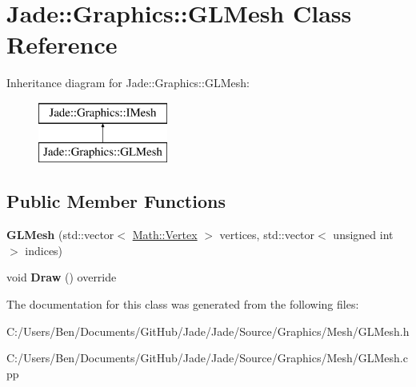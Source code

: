 \hypertarget{class_jade_1_1_graphics_1_1_g_l_mesh}{}\section{Jade\+:\+:Graphics\+:\+:G\+L\+Mesh Class Reference}
\label{class_jade_1_1_graphics_1_1_g_l_mesh}
Inheritance diagram for Jade\+:\+:Graphics\+:\+:G\+L\+Mesh\+:\begin{figure}[H]
\begin{center}
\leavevmode
\includegraphics[height=2.000000cm]{class_jade_1_1_graphics_1_1_g_l_mesh}
\end{center}
\end{figure}
\subsection*{Public Member Functions}
\begin{DoxyCompactItemize}
\item 
\hypertarget{class_jade_1_1_graphics_1_1_g_l_mesh_a677cf6bfbc8c053087d7ca8f6eeb4d7a}{}{\bfseries G\+L\+Mesh} (std\+::vector$<$ \hyperlink{struct_jade_1_1_math_1_1_vertex}{Math\+::\+Vertex} $>$ vertices, std\+::vector$<$ unsigned int $>$ indices)\label{class_jade_1_1_graphics_1_1_g_l_mesh_a677cf6bfbc8c053087d7ca8f6eeb4d7a}

\item 
\hypertarget{class_jade_1_1_graphics_1_1_g_l_mesh_a3f0484793be95a7c479e959f135dde93}{}void {\bfseries Draw} () override\label{class_jade_1_1_graphics_1_1_g_l_mesh_a3f0484793be95a7c479e959f135dde93}

\end{DoxyCompactItemize}


The documentation for this class was generated from the following files\+:\begin{DoxyCompactItemize}
\item 
C\+:/\+Users/\+Ben/\+Documents/\+Git\+Hub/\+Jade/\+Jade/\+Source/\+Graphics/\+Mesh/G\+L\+Mesh.\+h\item 
C\+:/\+Users/\+Ben/\+Documents/\+Git\+Hub/\+Jade/\+Jade/\+Source/\+Graphics/\+Mesh/G\+L\+Mesh.\+cpp\end{DoxyCompactItemize}
